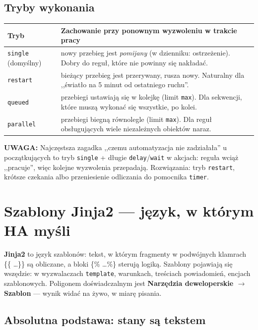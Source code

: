 \documentclass[11pt,a4paper]{article}
\newcommand{\uwaga}[1]{\par\medskip\noindent\textcolor{warnred}{\textbf{UWAGA:}} #1\par\medskip}
\begin{document}
\subsection{Tryby wykonania}

\begin{center}
\begin{tabular}{lp{10.2cm}}
\toprule
\textbf{Tryb} & \textbf{Zachowanie przy ponownym wyzwoleniu w trakcie pracy}\\
\midrule
\texttt{single} (domyślny) & nowy przebieg jest \emph{pomijany} (w dzienniku: ostrzeżenie). Dobry do reguł, które nie powinny się nakładać.\\
\texttt{restart} & bieżący przebieg jest przerywany, rusza nowy. Naturalny dla ,,światło na 5 minut od ostatniego ruchu''.\\
\texttt{queued} & przebiegi ustawiają się w kolejkę (limit \texttt{max}). Dla sekwencji, które muszą wykonać się wszystkie, po kolei.\\
\texttt{parallel} & przebiegi biegną równolegle (limit \texttt{max}). Dla reguł obsługujących wiele niezależnych obiektów naraz.\\
\bottomrule
\end{tabular}
\end{center}

\uwaga{Najczęstsza zagadka ,,czemu automatyzacja nie zadziałała'' u początkujących to tryb \texttt{single} + długie \texttt{delay}/\texttt{wait} w akcjach: reguła wciąż ,,pracuje'', więc kolejne wyzwolenia przepadają. Rozwiązania: tryb \texttt{restart}, krótsze czekania albo przeniesienie odliczania do pomocnika \texttt{timer}.}

\section{Szablony Jinja2 --- język, w którym HA myśli}
\label{sec:jinja}

\textbf{Jinja2} to język szablonów: tekst, w którym fragmenty w podwójnych klamrach \{\{ \ldots \}\} są obliczane, a bloki \{\% \ldots \%\} sterują logiką. Szablony pojawiają się wszędzie: w wyzwalaczach \texttt{template}, warunkach, treściach powiadomień, encjach szablonowych. Poligonem doświadczalnym jest \textbf{Narzędzia deweloperskie $\to$ Szablon} --- wynik widać na żywo, w miarę pisania.

\subsection{Absolutna podstawa: stany są tekstem}
\end{document}
